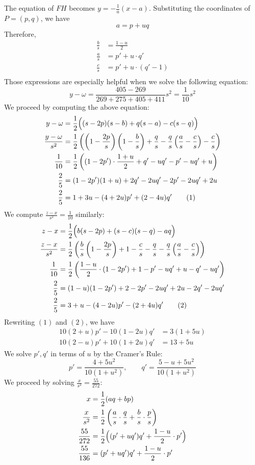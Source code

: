 \begin{enumerate}
 The equation of $FH$ becomes $y=-\frac{1}{u}(x-a)$. Substituting the coordinates of $P=(p,q)$, we have
 \[a=p+uq\]Therefore,\begin{align*}\frac{b}{s}&=\frac{1-u}{2}\\\frac{a}{s}&=p'+u\cdot q'\\\frac{c}{s}&=p'+u\cdot\left(q'-1\right)\\\end{align*}
Those expressions are especially helpful when we solve the following equation:
 \[y-\omega=\frac{405-269}{269+275+405+411}s^2=\frac{1}{10}s^2\]We proceed by computing the above equation:\begin{align*}y-\omega&=\frac{1}{2}\Bigl((s-2p)(s-b)+q(s-a)-c(s-q)\Bigr)\\\frac{y-\omega}{s^2}&=\frac{1}{2}\left(\left(1-\frac{2p}{s}\right)\left(1-\frac{b}{s}\right)+\frac{q}{s}-\frac{q}{s}\left(\frac{a}{s}-\frac{c}{s}\right)-\frac{c}{s}\right)\\\frac{1}{10}&=\frac{1}{2}\left((1-2p')\cdot\frac{1+u}{2}+q'-uq'-p'-uq'+u\right)\\\frac{2}{5}&=(1-2p')(1+u)+2q'-2uq'-2p'-2uq'+2u\\\frac{2}{5}&=1+3u-(4+2u)p'+(2-4u)q'\tag{1}\end{align*}
We compute $\frac{z-x}{s^2}=\frac{1}{10}$ similarly:\begin{align*}z-x&=\frac{1}{2}\Bigl(b(s-2p)+(s-c)(s-q)-aq\Bigr)\\\frac{z-x}{s^2}&=\frac{1}{2}\left(\frac{b}{s}\left(1-\frac{2p}{s}\right)+1-\frac{c}{s}-\frac{q}{s}-\frac{q}{s}\left(\frac{a}{s}-\frac{c}{s}\right)\right)\\\frac{1}{10}&=\frac{1}{2}\left(\frac{1-u}{2}\cdot(1-2p')+1-p'-uq'+u-q'-uq'\right)\\\frac{2}{5}&=(1-u)(1-2p')+2-2p'-2uq'+2u-2q'-2uq'\\\frac{2}{5}&=3+u-(4-2u)p'-(2+4u)q'\tag{2}\end{align*}
Rewriting $(1)$ and $(2)$, we have\begin{align*}10(2+u)p'-10(1-2u)q'&=3(1+5u)\\10(2-u)p'+10(1+2u)q'&=13+5u\end{align*}
We solve $p',q'$ in terms of $u$ by the Cramer's Rule:
 \[p'=\frac{4+5u^2}{10(1+u^2)},\qquad q'=\frac{5-u+5u^2}{10(1+u^2)}\]We proceed by solving $\frac{x}{s^2}=\frac{55}{272}$:\begin{align*}x&=\frac{1}{2}(aq+bp)\\\frac{x}{s^2}&=\frac{1}{2}\left(\frac{a}{s}\cdot\frac{q}{s}+\frac{b}{s}\cdot\frac{p}{s}\right)\\\frac{55}{272}&=\frac{1}{2}\Bigl((p'+uq')q'+\frac{1-u}{2}\cdot p'\Bigr)\\\frac{55}{136}&=(p'+uq')q'+\frac{1-u}{2}\cdot p'\end{align*}

\end{enumerate}
